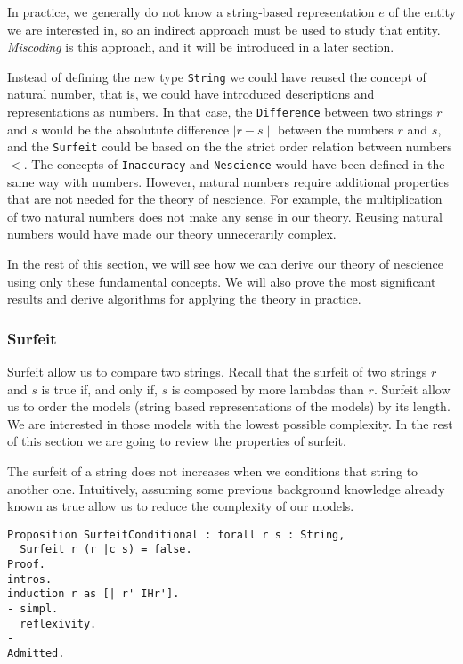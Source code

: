 In practice, we generally do not know a string-based representation $e$ of the entity we are interested in, so an indirect approach must be used to study that entity. \emph{Miscoding} is this approach, and it will be introduced in a later section.

Instead of defining the new type \texttt{String} we could have reused the concept of natural number, that is, we could have introduced descriptions and representations as numbers. In that case, the \texttt{Difference} between two strings $r$ and $s$ would be the absolutute difference $\mid r - s \mid$ between the numbers $r$ and $s$, and the \texttt{Surfeit} could be based on the the strict order relation between numbers $<$. The concepts of \texttt{Inaccuracy} and \texttt{Nescience} would have been defined in the same way with numbers. However, natural numbers require additional properties that are not needed for the theory of nescience. For example, the multiplication of two natural numbers does not make any sense in our theory.  Reusing natural numbers would have made our theory unnecerarily complex.

In the rest of this section, we will see how we can derive our theory of nescience using only these fundamental concepts. We will also prove the most significant results and derive algorithms for applying the theory in practice.


\subsubsection*{Surfeit}

Surfeit allow us to compare two strings. Recall that the surfeit of two strings $r$ and $s$ is true if, and only if, $s$ is composed by more lambdas than $r$. Surfeit allow us to order the models (string based representations of the models) by its length. We are interested in those models with the lowest possible complexity. In the rest of this section we are going to review the properties of surfeit.

The surfeit of a string does not increases when we conditions that string to another one. Intuitively, assuming some previous background knowledge already known as true allow us to reduce the complexity of our models.

\begin{sourcecode}
{\scriptsize \begin{verbatim}
Proposition SurfeitConditional : forall r s : String, 
  Surfeit r (r |c s) = false.
Proof.
intros.
induction r as [| r' IHr'].
- simpl.
  reflexivity.
-
Admitted.
\end{verbatim}}
\end{sourcecode}

